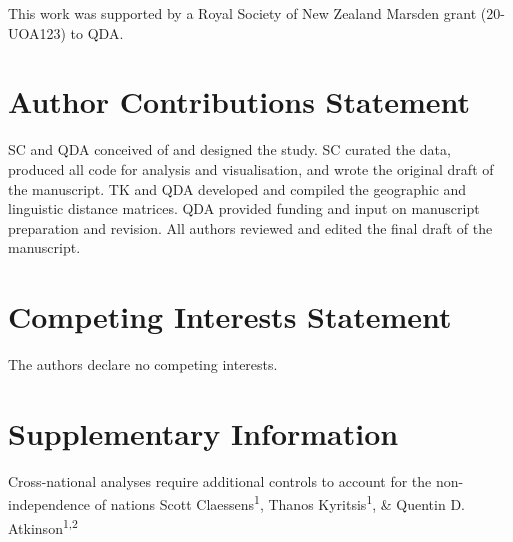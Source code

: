 \documentclass[
  man,floatsintext]{apa6}
\begin{document}
This work was supported by a Royal Society of New Zealand Marsden grant (20-UOA123) to QDA.

\hypertarget{author-contributions-statement}{%
\section{Author Contributions Statement}\label{author-contributions-statement}}

SC and QDA conceived of and designed the study. SC curated the data, produced all code for analysis and visualisation, and wrote the original draft of the manuscript. TK and QDA developed and compiled the geographic and linguistic distance matrices. QDA provided funding and input on manuscript preparation and revision. All authors reviewed and edited the final draft of the manuscript.

\hypertarget{competing-interests-statement}{%
\section{Competing Interests Statement}\label{competing-interests-statement}}

The authors declare no competing interests.

\newpage
\vspace*{60mm}

\renewcommand{\figurename}{Supplementary Figure}
\renewcommand{\tablename}{Supplementary Table}
\renewcommand{\thefigure}{\arabic{figure}} \setcounter{figure}{0}
\renewcommand{\thetable}{\arabic{table}} \setcounter{table}{0}
\renewcommand{\theequation}{S\arabic{equation}} \setcounter{equation}{0}

\hypertarget{supplementary-information}{%
\section{\texorpdfstring{\textbf{Supplementary Information}}{Supplementary Information}}\label{supplementary-information}}

\setcounter{page}{1}
\centering

\noindent \small Cross-national analyses require additional controls to account for the non-independence of nations \newline
\hspace*{1cm} \small Scott Claessens\textsuperscript{1}, Thanos Kyritsis\textsuperscript{1}, \& Quentin D. Atkinson\textsuperscript{1,2} \newline
\end{document}
